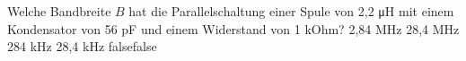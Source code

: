     {Welche Bandbreite $B$ hat die Parallelschaltung einer Spule von 2,2 μH mit einem Kondensator von 56 pF und einem Widerstand von 1 kOhm?}
    {2,84 MHz}
    {28,4 MHz}
    {284 kHz}
    {28,4 kHz}
    {false}{false}